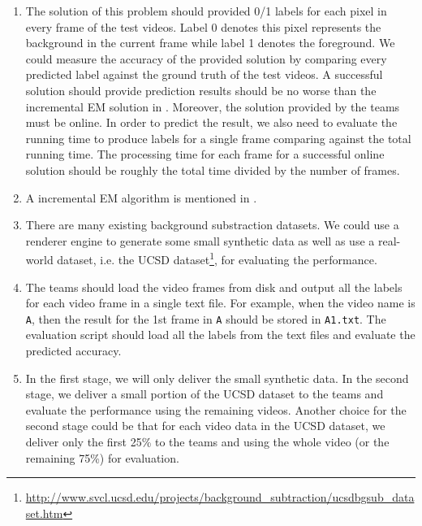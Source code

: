 \begin{enumerate}[i]
\item The solution of this problem should provided 0/1 labels for each pixel in every frame of the test videos. Label 0 denotes this pixel represents the background in the current frame while label 1 denotes the foreground. We could measure the accuracy of the provided solution by comparing every predicted label against the ground truth of the test videos. A successful solution should provide prediction results should be no worse than the incremental EM solution in \cite{friedman1997image}.
    Moreover, the solution provided by the teams must be online. In order to predict the result, we also need to evaluate the running time to produce labels for a single frame comparing against the total running time. The processing time for each frame for a successful online solution should be roughly the total time divided by the number of frames.
\item A incremental EM algorithm is mentioned in \cite{friedman1997image}.
\item There are many existing background substraction datasets. We could use a renderer engine to generate some small synthetic data as well as use a real-world dataset, i.e. the UCSD dataset\footnote{\url{http://www.svcl.ucsd.edu/projects/background_subtraction/ucsdbgsub_dataset.htm}}, for evaluating the performance.
\item The teams should load the video frames from disk and output all the labels for each video frame in a single text file. For example, when the video name is \texttt{A}, then the result for the 1st frame in \texttt{A} should be stored in \texttt{A1.txt}. The evaluation script should load all the labels from the text files and evaluate the predicted accuracy.
\item In the first stage, we will only deliver the small synthetic data. In the second stage, we deliver a small portion of the UCSD dataset to the teams and evaluate the performance using the remaining videos. Another choice for the second stage could be that for each video data in the UCSD dataset, we deliver only the first 25\% to the teams and using the whole video (or the remaining 75\%) for evaluation.
\end{enumerate} 